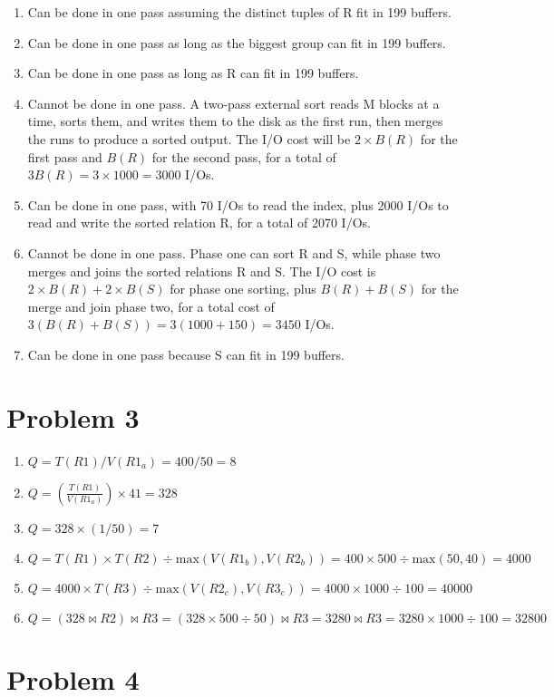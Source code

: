 \documentclass[a4paper, 12pt]{article}
\begin{document}
\begin{enumerate}[label=(\alph*)]
	\item Can be done in one pass assuming the distinct tuples of R fit in 199
		buffers.
	\item Can be done in one pass as long as the biggest group can fit in 199
		buffers.
	\item Can be done in one pass as long as R can fit in 199 buffers.
	\item Cannot be done in one pass. A two-pass external sort reads M blocks at
		a time, sorts them, and writes them to the disk as the first run, then
		merges the runs to produce a sorted output. The I/O cost will be $ 2
		\times B(R) $ for the first pass and $ B(R) $ for the second pass, for a
		total of $ 3 B(R) = 3 \times 1000 = 3000 $ I/Os.
	\item Can be done in one pass, with 70 I/Os to read the index, plus 2000
		I/Os to read and write the sorted relation R, for a total of 2070 I/Os.
	\item Cannot be done in one pass. Phase one can sort R and S, while phase
		two merges and joins the sorted relations R and S. The I/O cost is $ 2
		\times B(R) + 2 \times B(S) $ for phase one sorting, plus $ B(R) + B(S)
		$ for the merge and join phase two, for a total cost of $ 3 ( B(R) +
		B(S)) = 3 ( 1000 + 150 ) = 3450 $ I/Os.
	\item Can be done in one pass because S can fit in 199 buffers.
\end{enumerate}

\section*{Problem 3}

\begin{enumerate}
	\item $ Q = T(R1) / V(R1_a) = 400 / 50 = 8 $
	\item $ Q = \left ( \frac{T(R1)}{V(R1_a)} \right ) \times 41 = 328 $
	\item $ Q = 328 \times (1 / 50) = 7 $
	\item $ Q = T(R1) \times T(R2) \div \text{max}(V(R1_b), V(R2_b)) = 400
		\times 500 \div \text{max}(50, 40) = 4000 $
	\item $ Q = 4000 \times T(R3) \div \text{max}(V(R2_c), V(R3_c)) = 4000
		\times 1000 \div 100 = 40000 $
	\item $ Q = ( 328 \bowtie R2 ) \bowtie R3 = ( 328 \times 500 \div 50 )
		\bowtie R3 = 3280 \bowtie R3 = 3280 \times 1000 \div 100 = 32800 $
\end{enumerate}

\section*{Problem 4}
\end{document}
